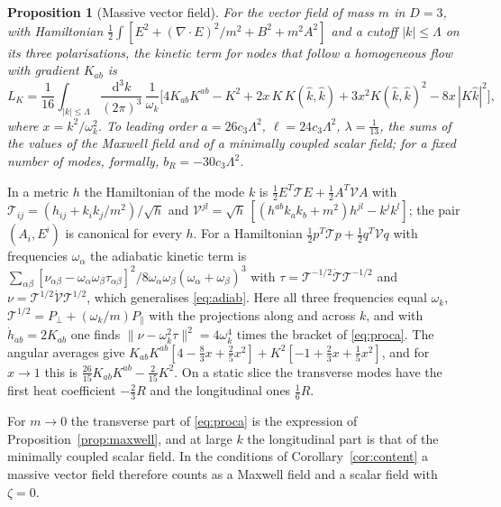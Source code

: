 \documentclass[11pt,a4paper]{article}
\makeatletter
\theoremstyle{stmt}
\newtheorem{proposition}[theorem]{Proposition}
\theoremstyle{defn}
\theoremstyle{rmk}
\renewenvironment{proof}[1][\proofname]{\par\pushQED{\qed}\normalfont\topsep6\p@\@plus6\p@\relax
  \trivlist\item[\hskip\labelsep{\sffamily\itshape\small #1.}]\ignorespaces}{\popQED\endtrivlist\@endpefalse}
\numberwithin{equation}{section}
\newcommand{\dd}{\mathrm{d}}
\makeatother
\begin{document}
\begin{proposition}[Massive vector field]\label{prop:proca}
For the vector field of mass $m$ in $D=3$, with Hamiltonian $\tfrac12\int[E^2+(\nabla\!\cdot\!E)^2/m^2+B^2+m^2A^2]$ and a cutoff $|k|\le\Lambda$ on its three polarisations, the kinetic term for nodes that follow a homogeneous flow with gradient $K_{ab}$ is
\begin{equation}\label{eq:proca}
L_K=\frac{1}{16}\int_{|k|\le\Lambda}\frac{\dd^3k}{(2\pi)^3}\,\frac{1}{\omega_k}\Big[4K_{ab}K^{ab}-K^2+2x\,K\,K(\hat k,\hat k)+3x^2K(\hat k,\hat k)^2-8x\,|K\hat k|^2\Big],
\end{equation}
where $x=k^2/\omega_k^2$.
To leading order $a=26c_3\Lambda^2$, $\ell=24c_3\Lambda^2$, $\lambda=\tfrac1{13}$, the sums of the values of the Maxwell field and of a minimally coupled scalar field; for a fixed number of modes, formally, $b_R=-30c_3\Lambda^2$.
\end{proposition}

\begin{proof}
In a metric $h$ the Hamiltonian of the mode $k$ is $\tfrac12E^{T}\mathcal TE+\tfrac12A^{T}\mathcal VA$ with $\mathcal T_{ij}=(h_{ij}+k_ik_j/m^2)/\sqrt h$ and $\mathcal V^{jl}=\sqrt h\,[(h^{ab}k_ak_b+m^2)h^{jl}-k^jk^l]$; the pair $(A_i,E^i)$ is canonical for every $h$. For a Hamiltonian $\tfrac12p^{T}\mathcal Tp+\tfrac12q^{T}\mathcal Vq$ with frequencies $\omega_\alpha$ the adiabatic kinetic term is $\sum_{\alpha\beta}[\nu_{\alpha\beta}-\omega_\alpha\omega_\beta\tau_{\alpha\beta}]^2/8\omega_\alpha\omega_\beta(\omega_\alpha+\omega_\beta)^3$ with $\tau=\mathcal T^{-1/2}\dot{\mathcal T}\mathcal T^{-1/2}$ and $\nu=\mathcal T^{1/2}\dot{\mathcal V}\mathcal T^{1/2}$, which generalises \eqref{eq:adiab}. Here all three frequencies equal $\omega_k$, $\mathcal T^{1/2}=P_\perp+(\omega_k/m)P_\parallel$ with the projections along and across $k$, and with $\dot h_{ab}=2K_{ab}$ one finds $\|\nu-\omega_k^2\tau\|^2=4\omega_k^4$ times the bracket of \eqref{eq:proca}. The angular averages give $K_{ab}K^{ab}[4-\tfrac83x+\tfrac25x^2]+K^2[-1+\tfrac23x+\tfrac15x^2]$, and for $x\to1$ this is $\tfrac{26}{15}K_{ab}K^{ab}-\tfrac2{15}K^2$. On a static slice the transverse modes have the first heat coefficient $-\tfrac23R$ and the longitudinal ones $\tfrac16R$.
\end{proof}

For $m\to0$ the transverse part of \eqref{eq:proca} is the expression of Proposition~\ref{prop:maxwell}, and at large $k$ the longitudinal part is that of the minimally coupled scalar field. In the conditions of Corollary~\ref{cor:content} a massive vector field therefore counts as a Maxwell field and a scalar field with $\zeta=0$.
\end{document}
